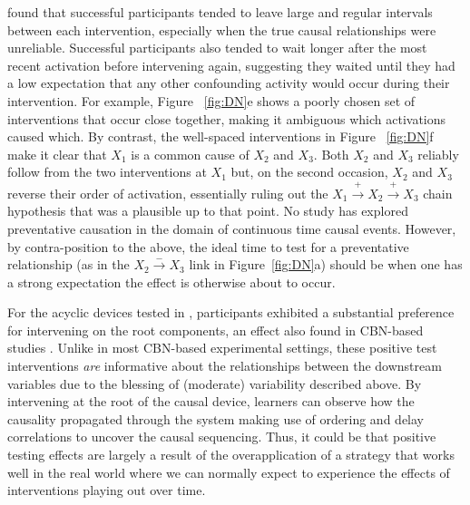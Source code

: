 \documentclass{cambridge7A}%
\begin{document}
\cite{bramley2017dynamic} found that successful participants tended to leave large and regular intervals between each intervention, especially when the true causal relationships were unreliable.  Successful participants also tended to wait longer after the most recent activation before intervening again, suggesting they waited until they had a low expectation that any other confounding activity would occur during their intervention.  For example, Figure ~\ref{fig:DN}e shows a poorly chosen set of interventions that occur close together, making it ambiguous which activations caused which.  By contrast, the well-spaced interventions in Figure ~\ref{fig:DN}f make it clear that $X_1$ is a common cause of $X_2$ and $X_3$.  Both $X_2$ and $X_3$ reliably follow from the two interventions at $X_1$ but, on the second occasion, $X_2$ and $X_3$ reverse their order of activation, essentially ruling out the $X_1\!\stackrel{+}\rightarrow\!X_2\!\stackrel{+}\rightarrow\!X_3$ chain hypothesis that was a plausible up to that point.  No study has explored preventative causation in the domain of continuous time causal events. However, by contra-position to the above, the ideal time to test for a preventative relationship (as in the $X_2\!\stackrel{-}\rightarrow\!X_3$ link in Figure~\ref{fig:DN}a) should be when one has a strong expectation the effect is otherwise about to occur.  

For the acyclic devices tested in \cite{bramley2017dynamic}, participants exhibited a substantial preference for intervening on the root components, an effect also found in CBN-based studies \citep[e.g.,][]{coenen2015strategies, bramley2015fcs}.  Unlike in most CBN-based experimental settings, these positive test interventions \emph{are} informative about the relationships between the downstream variables due to the blessing of (moderate) variability described above.   By intervening at the root of the causal device, learners can  observe how the causality propagated through the system making use of ordering and delay correlations to uncover the causal sequencing. Thus, it could be that positive testing effects are largely a result of the overapplication of a strategy that works well in the real world where we can normally expect to experience the effects of interventions playing out over time.
\end{document}
